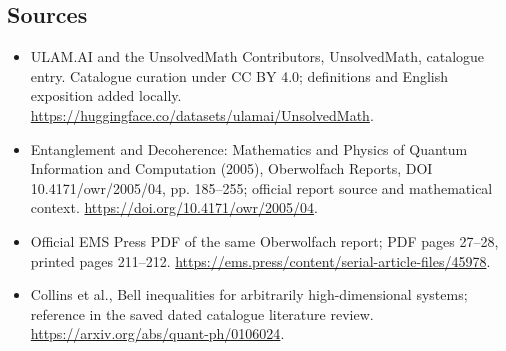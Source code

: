 \documentclass[11pt]{article}
\begin{document}
\subsection{Sources}
\begin{itemize}
\item[\hypertarget{source:statement:1}{S1}] ULAM.AI and the UnsolvedMath Contributors, UnsolvedMath, catalogue entry. Catalogue curation under CC BY 4.0; definitions and English exposition added locally.
\url{https://huggingface.co/datasets/ulamai/UnsolvedMath}.
\item[\hypertarget{source:statement:2}{S2}] Entanglement and Decoherence: Mathematics and Physics of Quantum Information and Computation (2005), Oberwolfach Reports, DOI 10.4171/owr/2005/04, pp. 185--255; official report source and mathematical context.
\url{https://doi.org/10.4171/owr/2005/04}.
\item[\hypertarget{source:statement:3}{S3}] Official EMS Press PDF of the same Oberwolfach report; PDF pages 27--28, printed pages 211--212.
\url{https://ems.press/content/serial-article-files/45978}.
\item[\hypertarget{source:statement:4}{S4}] Collins et al., Bell inequalities for arbitrarily high-dimensional systems; reference in the saved dated catalogue literature review.
\url{https://arxiv.org/abs/quant-ph/0106024}.
\end{itemize}
\label{end:statement}
\end{document}
